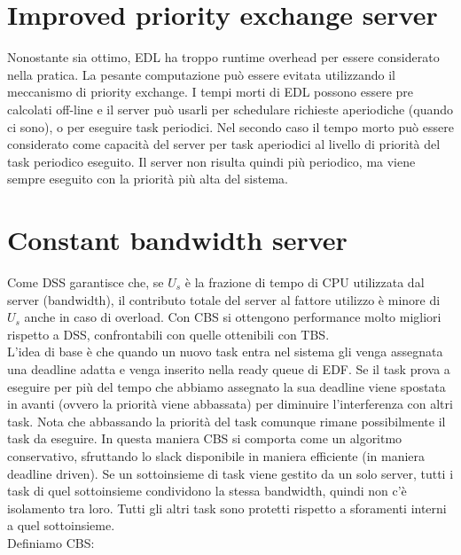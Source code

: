 \documentclass[12pt,openany,onesided]{book}
\begin{document}
\section{Improved priority exchange server}
Nonostante sia ottimo, EDL ha troppo runtime overhead per essere considerato nella pratica.
La pesante computazione può essere evitata utilizzando il meccanismo di priority exchange.
I tempi morti di EDL possono essere pre calcolati off-line e il server può usarli per schedulare richieste aperiodiche (quando ci sono), o per eseguire task periodici.
Nel secondo caso il tempo morto può essere considerato come capacità del server per task aperiodici al livello di priorità del task periodico eseguito.
Il server non risulta quindi più periodico, ma viene sempre eseguito con la priorità più alta del sistema.
\section{Constant bandwidth server}
\label{sec:constantBandwidthServer}
Come DSS garantisce che, se $U_s$ è la frazione di tempo di CPU utilizzata dal server (bandwidth), il contributo totale del server al fattore utilizzo è minore di $U_s$ anche in caso di overload.
Con CBS si ottengono performance molto migliori rispetto a DSS, confrontabili con quelle ottenibili con TBS.\\
L'idea di base è che quando un nuovo task entra nel sistema gli venga assegnata una deadline adatta e venga inserito nella ready queue di EDF.
Se il task prova a eseguire per più del tempo che abbiamo assegnato la sua deadline viene spostata in avanti (ovvero la priorità viene abbassata) per diminuire l'interferenza con altri task.
Nota che abbassando la priorità del task comunque rimane possibilmente il task da eseguire. 
In questa maniera CBS si comporta come un algoritmo conservativo, sfruttando lo slack disponibile in maniera efficiente (in maniera deadline driven).
Se un sottoinsieme di task viene gestito da un solo server, tutti i task di quel sottoinsieme condividono la stessa bandwidth, quindi non c'è isolamento tra loro.
Tutti gli altri task sono protetti rispetto a sforamenti interni a quel sottoinsieme.\\
Definiamo CBS:
\end{document}
